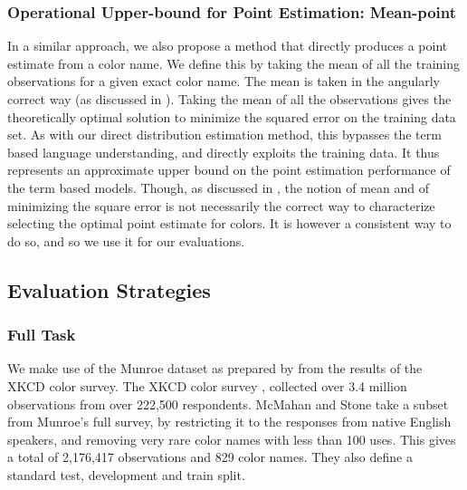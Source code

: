 \documentclass[]{clv3}
\newcommand{\parencite}{\citep}
\newcommand{\textcite}{\citet}
\begin{document}
\subsubsection{Operational Upper-bound for Point Estimation: Mean-point}
In a similar approach, we also propose a method that directly produces a point estimate from a color name.
We define this by taking the mean of all the training observations for a given exact color name.
The mean is taken in the angularly correct way (as discussed in ).
Taking the mean of all the observations gives the theoretically optimal solution to minimize the squared error on the training data set.
As with our direct distribution estimation method, this bypasses the term based language understanding, and directly exploits the training data.
It thus represents an approximate upper bound on the point estimation performance of the term based models.
Though, as discussed in , the notion of mean and of minimizing the square error is not necessarily the correct way to characterize selecting the optimal point estimate for colors.
It is however a consistent way to do so, and so we use it for our evaluations.



\subsection{Evaluation Strategies}

\subsubsection{Full Task}
We make use of the  Munroe dataset as prepared by \textcite{mcmahan2015bayesian} from the results of the XKCD color survey.
The XKCD color survey \parencite{Munroe2010XKCDdataset}, collected over 3.4 million observations from over 222,500 respondents.
McMahan and Stone take a subset from Munroe's full survey, by restricting it to the responses from native English speakers, 
and removing very rare color names with less than 100 uses.
This gives a total of 2,176,417 observations and 829 color names. 
They also define a standard test, development and train split.
\end{document}
